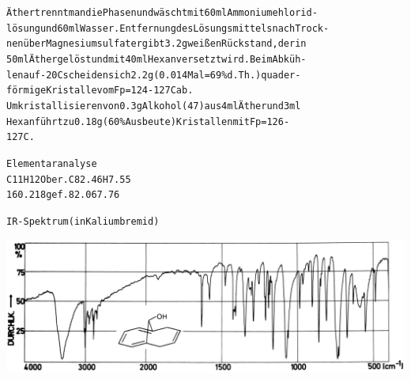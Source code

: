 \documentclass[a4paper,11pt]{article}
\begin{document}
\begin{alltt}
\newpage
{}


Äther trennt man die Phasen und wäscht mit 60 ml Ammoniumehlorid-
lösung und 60 ml Wasser. Entfernung des Lösungsmittels nach Trock-
nen über Magnesiumsulfat ergibt 3.2 g weißen Rückstand, der in
50 ml Äther gelöst und mit 40 ml Hexan versetzt wird. Beim Abküh-
len auf -20\degree{}C scheiden sich 2.2 g (0.014 Mal = 69 \% d.Th.) quader-
förmige Kristalle vom Fp = 124 - 127\degree{}C ab.
Umkristallisieren von 0.3 g Alkohol (47) aus 4 ml Äther und 3 ml
Hexan führt zu 0.18 g (60 \% Ausbeute) Kristallen mit Fp = 126 -
127\degree{}C.

Elementaranalyse
C11H12O ber. C  82.46   H  7.55
160.218 gef.    82.06      7.76

IR-Spektrum (in Kaliumbremid)
\end{alltt}
\hspace*{-0.5cm}\includegraphics[width=14.92cm]{IR_044}
\end{document}
